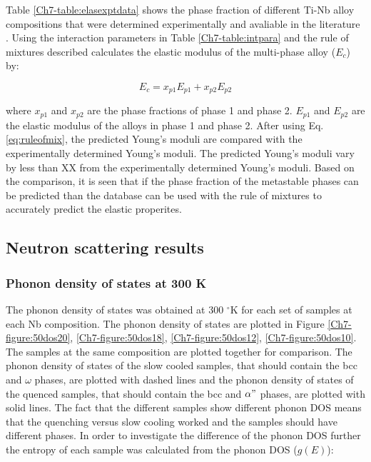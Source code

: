 Table \ref{Ch7-table:elasexptdata} shows the phase fraction of different Ti-Nb alloy compositions that were determined experimentally and avaliable in the literature \cite{Ozaki2004,Timoshevskii2011,Friak2012,Karre2015}. Using the interaction parameters in Table \ref{Ch7-table:intpara} and the rule of mixtures described calculates the elastic modulus of the multi-phase alloy ($E_{c}$) by:

\begin{equation}
\label{eq:ruleofmix}
E_{c}=x_{p1}E_{p1}+x_{p2}E_{p2}
\end{equation}

\noindent where $x_{p1}$ and $x_{p2}$ are the phase fractions of phase 1 and phase 2. $E_{p1}$ and $E_{p2}$ are the elastic modulus of the alloys in phase 1 and phase 2. After using Eq. \ref{eq:ruleofmix}, the predicted Young's moduli are compared with the experimentally determined Young's moduli. The predicted Young's moduli vary by less than XX from the experimentally determined Young's moduli. Based on the comparison, it is seen that if the phase fraction of the metastable phases can be predicted than the database can be used with the rule of mixtures to accurately predict the elastic properites. 

\subsection{Neutron scattering results}

\subsubsection{Phonon density of states at 300 K}

The phonon density of states was obtained at 300 $^\circ$K for each set of samples at each Nb composition. The phonon density of states are plotted in Figure \ref{Ch7-figure:50dos20}, \ref{Ch7-figure:50dos18}, \ref{Ch7-figure:50dos12}, \ref{Ch7-figure:50dos10}. The samples at the same composition are plotted together for comparison. The phonon density of states of the slow cooled samples, that should contain the bcc and $\omega$ phases, are plotted with dashed lines and the phonon density of states of the quenced samples, that should contain the bcc and $\alpha "$ phases, are plotted with solid lines. The fact that the different samples show different phonon DOS means that the quenching versus slow cooling worked and the samples should have different phases. In order to investigate the difference of the phonon DOS further the entropy of each sample was calculated from the phonon DOS ($g(E)$):

